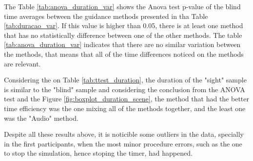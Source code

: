 

The Table \ref{tab:anova_duration_var} shows the Anova test p-value of the blind time averages between the guidance methods presented in tha Table \ref{tab:duracao_var}. If this value is higher than 0.05, there is at least one method that has no statistically difference between one of the other methods. The table \ref{tab:anova_duration_var} indicates that there are no similar variation between the methods, that means that all of the time differences noticed on the methods are relevant.





%
%

Considering the on Table \ref{tab:ttest_duration}, the duration of the "sight" sample is similar to the "blind" sample and considering the conclusion from the ANOVA test and the Figure \ref{fig:boxplot_duration_scene}, the method that had the better time efficiency was the one mixing all of the methods together, and the least one was the "Audio" method.

Despite all these results above, it is noticible some outliers in the data, specially in the first participants, when the most minor procedure errors, such as the one to stop the simulation, hence stoping the timer, had happened.

